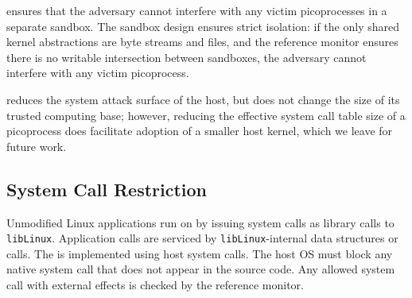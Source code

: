 \graphene{} ensures that %
the adversary cannot interfere with any victim picoprocesses
in a separate sandbox.  
The \graphene{} sandbox design ensures strict isolation: 
if the only shared kernel abstractions are byte streams and files, 
and the reference monitor ensures
there is no writable intersection between sandboxes,
the adversary cannot interfere with any victim picoprocess.



\graphene{} reduces the system attack surface of the host, but does not change the size of its
trusted computing base; however, reducing the effective system call table
size of a picoprocess does facilitate adoption of a smaller host kernel,
which we leave for future work.

\subsection{System Call Restriction}
\label{sec:graphene:security:syscalls}


Unmodified Linux applications run on \graphene{} by issuing 
system calls as library calls to {\tt libLinux}.
Application calls are serviced by {\tt libLinux}-internal data structures
or \pal{} calls.
The \pal{} is implemented using \nativecalls{} host system calls.
The host OS must block any 
native system call that 
does not appear in the \pal{} source code.
Any allowed system call with external effects is checked by 
the reference monitor.
 





